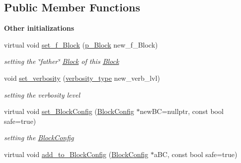\subsection*{Public Member Functions}
\begin{Indent}\textbf{ Other initializations}\par
\begin{DoxyCompactItemize}
\item 
\mbox{\label{class_s_m_spp__di__unipi__it_1_1_block_aa98cf714a6b71016561b82800d158187}} 
virtual void \mbox{\hyperlink{class_s_m_spp__di__unipi__it_1_1_block_aa98cf714a6b71016561b82800d158187}{set\+\_\+f\+\_\+\+Block}} (\mbox{\hyperlink{group___block___t_y_p_e_s_ga753932d88360bdd26edd3ad0397c99f9}{p\+\_\+\+Block}} new\+\_\+f\+\_\+\+Block)
\begin{DoxyCompactList}\small\item\em setting the \char`\"{}father\char`\"{} \mbox{\hyperlink{class_s_m_spp__di__unipi__it_1_1_block}{Block}} of this \mbox{\hyperlink{class_s_m_spp__di__unipi__it_1_1_block}{Block}} \end{DoxyCompactList}\item 
\mbox{\label{class_s_m_spp__di__unipi__it_1_1_block_ad98806b8cd2b4084581413c2cb3445a0}} 
void \mbox{\hyperlink{class_s_m_spp__di__unipi__it_1_1_block_ad98806b8cd2b4084581413c2cb3445a0}{set\+\_\+verbosity}} (\mbox{\hyperlink{class_s_m_spp__di__unipi__it_1_1_block_aae1eff6b4e72eef08cf2d8334500f9b6}{verbosity\+\_\+type}} new\+\_\+verb\+\_\+lvl)
\begin{DoxyCompactList}\small\item\em setting the verbosity level \end{DoxyCompactList}\item 
virtual void \mbox{\hyperlink{class_s_m_spp__di__unipi__it_1_1_block_a18d411b740a47db00d15083c5c7ef2ba}{set\+\_\+\+Block\+Config}} (\mbox{\hyperlink{class_s_m_spp__di__unipi__it_1_1_block_config}{Block\+Config}} $\ast$new\+BC=nullptr, const bool safe=true)
\begin{DoxyCompactList}\small\item\em setting the \mbox{\hyperlink{class_s_m_spp__di__unipi__it_1_1_block_config}{Block\+Config}} \end{DoxyCompactList}\item 
virtual void \mbox{\hyperlink{class_s_m_spp__di__unipi__it_1_1_block_a938909c39570800cc7356eff74b8b7b9}{add\+\_\+to\+\_\+\+Block\+Config}} (\mbox{\hyperlink{class_s_m_spp__di__unipi__it_1_1_block_config}{Block\+Config}} $\ast$a\+BC, const bool safe=true)

\end{DoxyCompactItemize}
\end{Indent}
